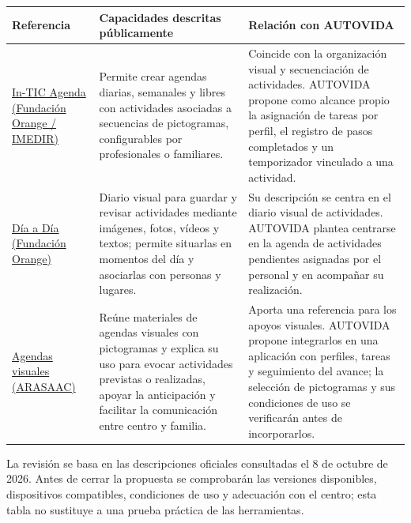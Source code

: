 \begin{center}
\small
\begin{tabularx}{\textwidth}{|>{\raggedright\arraybackslash}p{3.1cm}|>{\raggedright\arraybackslash}X|>{\raggedright\arraybackslash}p{5.1cm}|}
\hline
\rowcolor{tableHeader}
Referencia & Capacidades descritas públicamente & Relación con AUTOVIDA \\
\hline
\href{https://fundacionorange.es/aplicaciones/in-tic-agenda/}{In-TIC Agenda (Fundación Orange / IMEDIR)} & Permite crear agendas diarias, semanales y libres con actividades asociadas a secuencias de pictogramas, configurables por profesionales o familiares. & Coincide con la organización visual y secuenciación de actividades. AUTOVIDA propone como alcance propio la asignación de tareas por perfil, el registro de pasos completados y un temporizador vinculado a una actividad. \\
\hline
\href{https://fundacionorange.es/aplicaciones/dia-a-dia/}{Día a Día (Fundación Orange)} & Diario visual para guardar y revisar actividades mediante imágenes, fotos, vídeos y textos; permite situarlas en momentos del día y asociarlas con personas y lugares. & Su descripción se centra en el diario visual de actividades. AUTOVIDA plantea centrarse en la agenda de actividades pendientes asignadas por el personal y en acompañar su realización. \\
\hline
\href{https://aulaabierta.arasaac.org/materiales-caa-agendas-visuales}{Agendas visuales (ARASAAC)} & Reúne materiales de agendas visuales con pictogramas y explica su uso para evocar actividades previstas o realizadas, apoyar la anticipación y facilitar la comunicación entre centro y familia. & Aporta una referencia para los apoyos visuales. AUTOVIDA propone integrarlos en una aplicación con perfiles, tareas y seguimiento del avance; la selección de pictogramas y sus condiciones de uso se verificarán antes de incorporarlos. \\
\hline
\end{tabularx}
\end{center}

La revisión se basa en las descripciones oficiales consultadas el 8 de octubre de 2026. Antes de cerrar la propuesta se comprobarán las versiones disponibles, dispositivos compatibles, condiciones de uso y adecuación con el centro; esta tabla no sustituye a una prueba práctica de las herramientas.

